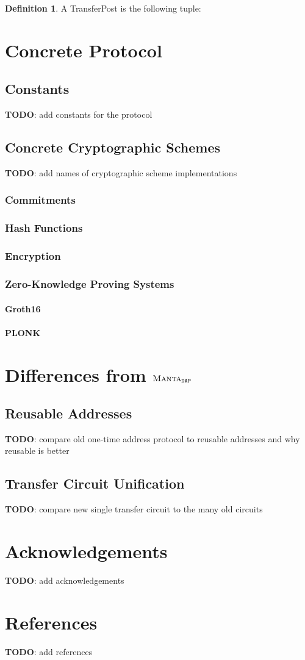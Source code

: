 \documentclass[a4paper]{article}
\newcommand{\subsubsubsection}[1]{\paragraph{#1}}
\newcommand{\lsection}[2]{\def\sectionlabel{#2} \section{#1}\label{sec:#2}}
\newcommand{\TODO}[1]{{\color{red}\textbf{TODO}}: #1}
\theoremstyle{definition}
\newtheorem{definition}{Definition}[subsection]
\newcommand{\MantaDAP}{{\Manta{}_{\texttt{DAP}}}}
\newcommand{\Manta}{{\textsc{Manta}}}
\newcommand{\TransferPost}{{\textsf{TransferPost}}}
\newcommand{\Transfer}{{\textsf{Transfer}}}
\begin{document}
\begin{definition}
    A \TransferPost{} is the following tuple:
\end{definition}

\lsection{Concrete Protocol}{concrete-protocol}

\subsection{Constants}

\TODO{add constants for the protocol}

\subsection{Concrete Cryptographic Schemes}

\TODO{add names of cryptographic scheme implementations}

\subsubsection{Commitments}

\subsubsection{Hash Functions}

\subsubsection{Encryption}

\subsubsection{Zero-Knowledge Proving Systems}

\subsubsubsection{Groth16}

\subsubsubsection{PLONK}

\lsection{Differences from $\MantaDAP$}{differences}

\subsection{Reusable Addresses}

\TODO{compare old one-time address protocol to reusable addresses and why reusable is better}

\subsection{\Transfer{} Circuit Unification}

\TODO{compare new single transfer circuit to the many old circuits}

\lsection{Acknowledgements}{acknowledgements}

\TODO{add acknowledgements}

\lsection{References}{references}

\TODO{add references}
\end{document}
